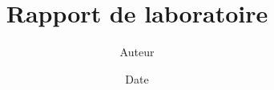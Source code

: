 \documentclass{article}
\begin{document}
    \title{Rapport de laboratoire}
    \author{Auteur}
    \date{Date}
    \maketitle
    \newpage
    \tableofcontents
    
\end{document}
